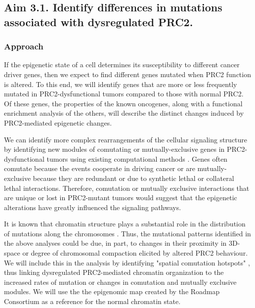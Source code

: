
\subsection*{Aim 3.1. Identify differences in mutations associated with dysregulated PRC2.}


\subsubsection*{Approach}

If the epigenetic state of a cell determines its susceptibility to different cancer driver genes, then we expect to find different genes mutated when PRC2 function is altered.
To this end, we will identify genes that are more or less frequently mutated in PRC2-dysfunctional tumors compared to those with normal PRC2. 
Of these genes, the properties of the known oncogenes, along with a functional enrichment analysis of the others, will describe the distinct changes induced by PRC2-mediated epigenetic changes.

We can identify more complex rearrangements of the cellular signaling structure by identifying new modules of comutating or mutually-exclusive genes in PRC2-dysfunctional tumors using existing computational methods \cite{Miller2011, Vandin2012, Ciriello2012, Jia2014, Zhang2014c, Ahmed2015, Kim2015, Leiserson2015, Babur2015, Leiserson2015b, Dao2017, Leiserson2016, Cho2016a, Reyna2018, Zhang2018e, Bokhari2020QuaDMutNetEx:Frequency.}.
Genes often comutate because the events cooperate in driving cancer or are mutually-exclusive because they are redundant or due to synthetic lethal \cite{Kaelin2005} or collateral lethal \cite{Muller2015} interactions.
Therefore, comutation or mutually exclusive interactions that are unique or lost in PRC2-mutant tumors would suggest that the epigenetic alterations have greatly influenced the signaling pathways.

It is known that chromatin structure plays a substantial role in the distribution of mutations along the chromosomes \cite{Schuster-Bockler2012, Polak2015, Gonzalez-Perez2019}.
Thus, the mutational patterns identified in the above analyses could be due, in part, to changes in their proximity in 3D-space or degree of chromosomal compaction elicited by altered PRC2 behaviour.
We will include this in the analysis by identifying "spatial comutation hotspots" \cite{Shi2016ChromatinGenes}, thus linking dysregulated PRC2-mediated chromatin organization to the increased rates of mutation or changes in comutation and mutually exclusive modules.
We will use the the epigenomic map created by the Roadmap Consortium \cite{Polak2015} as a reference for the normal chromatin state.

